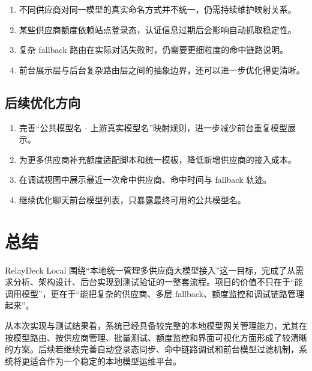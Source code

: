 \documentclass[12pt,a4paper]{ctexart}
\begin{document}
\begin{enumerate}[label=\arabic*.]
  \item 不同供应商对同一模型的真实命名方式并不统一，仍需持续维护映射关系。
  \item 某些供应商额度依赖站点登录态，认证信息过期后会影响自动抓取稳定性。
  \item 复杂 fallback 路由在实际对话失败时，仍需要更细粒度的命中链路说明。
  \item 前台展示层与后台复杂路由层之间的抽象边界，还可以进一步优化得更清晰。
\end{enumerate}

\subsection{后续优化方向}

\begin{enumerate}[label=\arabic*.]
  \item 完善“公共模型名 - 上游真实模型名”映射规则，进一步减少前台重复模型展示。
  \item 为更多供应商补充额度适配脚本和统一模板，降低新增供应商的接入成本。
  \item 在调试视图中展示最近一次命中供应商、命中时间与 fallback 轨迹。
  \item 继续优化聊天前台模型列表，只暴露最终可用的公共模型名。
\end{enumerate}

\section{总结}

RelayDeck Local 围绕“本地统一管理多供应商大模型接入”这一目标，完成了从需求分析、架构设计、后台实现到测试验证的一整套流程。项目的价值不只在于“能调用模型”，更在于“能把复杂的供应商、多层 fallback、额度监控和调试链路管理起来”。

从本次实现与测试结果看，系统已经具备较完整的本地模型网关管理能力，尤其在按模型路由、按供应商管理、批量测试、额度监控和界面可视化方面形成了较清晰的方案。后续若继续完善自动登录态同步、命中链路调试和前台模型过滤机制，系统将更适合作为一个稳定的本地模型运维平台。
\end{document}

